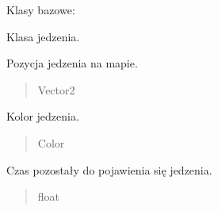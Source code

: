 \documentclass[letterpaper,10pt,polish]{sphinxmanual}
\begin{document}
\begin{fulllineitems}
\label{\detokenize{food:food.Food}}
\pysigstartsignatures
{}
\pysigstopsignatures
\sphinxAtStartPar
Klasy bazowe: 

\sphinxAtStartPar
Klasa jedzenia.

\begin{fulllineitems}
\label{\detokenize{food:food.Food.pos}}
\pysigstartsignatures
{}
\pysigstopsignatures
\sphinxAtStartPar
Pozycja jedzenia na mapie.
\begin{quote}\begin{description}
\sphinxAtStartPar
Vector2

\end{description}\end{quote}

\end{fulllineitems}


\begin{fulllineitems}
\label{\detokenize{food:food.Food.color}}
\pysigstartsignatures
{}
\pysigstopsignatures
\sphinxAtStartPar
Kolor jedzenia.
\begin{quote}\begin{description}
\sphinxAtStartPar
Color

\end{description}\end{quote}

\end{fulllineitems}


\begin{fulllineitems}
\label{\detokenize{food:food.Food.spawn_timer}}
\pysigstartsignatures
{}
\pysigstopsignatures
\sphinxAtStartPar
Czas pozostały do pojawienia się jedzenia.
\begin{quote}\begin{description}
\sphinxAtStartPar
float


\end{description}
\end{quote}
\end{fulllineitems}
\end{fulllineitems}
\end{document}
